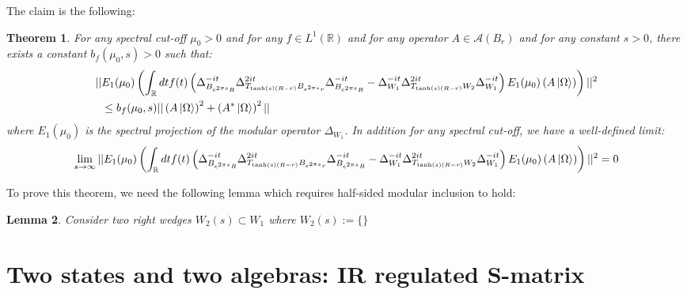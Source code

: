 \documentclass[a4paper,11pt]{article}
\newtheorem{theorem}{Theorem}
\newtheorem{lemma}[theorem]{Lemma}
\theoremstyle{definition}
\newcommand{\lb}{\left(}
\newcommand{\rb}{\right)}
\begin{document}
The claim is the following:
\begin{theorem}
    For any spectral cut-off $\mu_0 > 0$ and for any $f\in L^1(\mathbb{R})$ and for any operator $A\in\mathcal{A}(B_r)$ and for any constant $s > 0$, there exists a constant $b_f(\mu_0, s) >0$ such that:
    \begin{align}
        \begin{split}
            ||&E_1(\mu_0)\lb \int_\mathbb{R} dt f(t)\lb \Delta_{B_{e^{2\pi s}R}}^{-it}\Delta_{T_{\tanh(s)(R-r)}B_{e^{2\pi s}r}}^{2it}\Delta_{B_{e^{2\pi s}R}}^{-it} - \Delta_{W_1}^{-it}\Delta_{T_{\tanh(s)(R - r)}W_2}^{2it}\Delta_{W_1}^{-it} \rb E_1(\mu_0)\lb A\ket{\Omega}\rb \rb||^2 
            \\&
            \leq b_f(\mu_0, s)||\lb A\ket{\Omega}\rb^2 + \lb A^*\ket{\Omega} \rb^2||
        \end{split}
    \end{align}
    where $E_1(\mu_0)$ is the spectral projection of the modular operator $\Delta_{W_1}$. In addition for any spectral cut-off, we have a well-defined limit:
    \begin{align}
        \begin{split}
            \lim_{s\rightarrow\infty}||E_1(\mu_0)\lb \int_\mathbb{R} dt f(t)\lb \Delta_{B_{e^{2\pi s}R}}^{-it}\Delta_{T_{\tanh(s)(R-r)}B_{e^{2\pi s}r}}^{2it}\Delta_{B_{e^{2\pi s}R}}^{-it} - \Delta_{W_1}^{-it}\Delta_{T_{\tanh(s)(R - r)}W_2}^{2it}\Delta_{W_1}^{-it} \rb E_1(\mu_0)\lb A\ket{\Omega}\rb \rb||^2  = 0
        \end{split}
    \end{align}
\end{theorem}
To prove this theorem, we need the following lemma which requires half-sided modular inclusion to hold:
\begin{lemma}
    Consider two right wedges $W_2(s)\subset W_1$ where $W_2(s) := \{\}$
\end{lemma}

\section{Two states and two algebras: IR regulated S-matrix}
\end{document}
